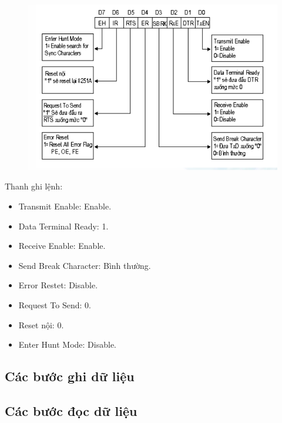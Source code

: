 \documentclass[../report.tex]{subfiles}
\begin{document}
\begin{figure}[H]
\centering
\includegraphics[width=12cm]{figures/8251-lenh.png}
\end{figure}

\noindent Thanh ghi lệnh: 
\begin{itemize}
\item Transmit Enable: Enable. 
\item Data Terminal Ready: 1. 
\item Receive Enable: Enable. 
\item Send Break Character: Bình thường. 
\item Error Restet: Disable. 
\item Request To Send: 0. 
\item Reset nội: 0. 
\item Enter Hunt Mode: Disable. 
\end{itemize}

\subsection{Các bước ghi dữ liệu}

\subsection{Các bước đọc dữ liệu}
\end{document}
